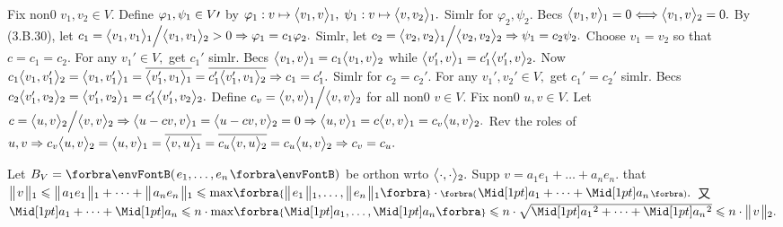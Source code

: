 Fix non0 $v_1,v_2\in V.$ Define $\varphi_1,\psi_1\in V\prime$ by $\varphi_1:v\mapsto\big\langle{}v_1,v{}\big\rangle{_1},\;\psi_1:v\mapsto\big\langle{}v,v_2{}\big\rangle{_1}.$ Simlr for $\varphi_2,\psi_2.$\parSol{}
Becs $\big\langle{}v_1,v{}\big\rangle{_1}=0\Longleftrightarrow\big\langle{}v_1,v{}\big\rangle{_2}=0.$ By (3.B.30), let $c_1=\big\langle{}v_1,v_1{}\big\rangle{_1}\Big/\big\langle{}v_1,v_1{}\big\rangle{_2}>0\Rightarrow\varphi_1=c_1\varphi_2.$\parSol{}
Simlr, let $c_2=\big\langle{}v_2,v_2{}\big\rangle{_1}\Big/\big\langle{}v_2,v_2{}\big\rangle{_2}\Rightarrow\psi_1=c_2\psi_2.$ Choose $v_1=v_2$ so that $c=c_1=c_2.$\vspace{3pt}\parSol{}
For any $v_1'\in V,$ get $c_1'$ simlr. Becs $\big\langle{}v_1,v{}\big\rangle{_1}=c_1\big\langle{}v_1,v{}\big\rangle{_2}$ while $\big\langle{}v_1',v{}\big\rangle{_1}=c_1'\big\langle{}v_1',v{}\big\rangle{_2}.$\vspace{1pt}\parSol{}
Now $c_1\big\langle{}v_1,v_1'{}\big\rangle{_2}=\big\langle{}v_1,v_1'{}\big\rangle{_1}=\overline{\big\langle{}v_1',v_1{}\big\rangle{_1}}=\overline{c_1'\big\langle{}v_1',v_1{}\big\rangle{_2}}\Rightarrow c_1=c_1'.$ Simlr for $c_2=c_2'.$\vspace{3pt}\parSol{}
\Or For any $v_1',v_2'\in V,$ get $c_1'=c_2'$ simlr. Becs $c_2\big\langle{}v_1',v_2{}\big\rangle{_2}=\big\langle{}v_1',v_2{}\big\rangle{_1}=c_1'\big\langle{}v_1',v_2{}\big\rangle{_2}.$\PfEnd\vspace{6pt}\parSol{}
\Or Define $c_v=\big\langle{}v,v{}\big\rangle{_1}\Big/\big\langle{}v,v{}\big\rangle{_2}$ for all non0 $v\in V.$ Fix non0 $u,v\in V.$\parSol{}
Let $c=\big\langle{}u,v{}\big\rangle{_2}\Big/\big\langle{}v,v{}\big\rangle{_2}\Rightarrow\big\langle{}u-cv,v{}\big\rangle{_1}=\big\langle{}u-cv,v{}\big\rangle{_2}=0\Rightarrow\big\langle{}u,v{}\big\rangle{_1}=c\big\langle{}v,v{}\big\rangle{_1}=c_v\big\langle{}u,v{}\big\rangle{_2}.$\vspace{1pt}\parSol{}
Rev the roles of $u,v\Rightarrow c_v\big\langle{}u,v{}\big\rangle{_2}={\big\langle{}u,v{}\big\rangle{_1}}=\overline{\big\langle{}v,u{}\big\rangle{_1}}=\overline{c_u\big\langle{}v,u{}\big\rangle{_2}}=c_u\big\langle{}u,v{}\big\rangle{_2}\Rightarrow c_v=c_u.$\PfEnd
\SepLine\pagebreak

Let $B_V=\Par{e_1,\dots,e_n}$ be orthon wrto $\big\langle{}\cdot,\cdot{}\big\rangle{_2}.$ Supp $v=a_1e_1+\dots+a_ne_n.$\vspace{1pt}\parSol{}
\NOTICE that $\Dvert{v}{_1}\leqslant\Dvert{a_1e_1}{_1}+\dots+\Dvert{a_ne_n}{_1}\leqslant\max\!\Bra{\Dvert{e_1}{_1},\dots,\Dvert{e_n}{_1}}\cdot\BigPar{\aMid{a_1}+\dots+\aMid{a_n}}.$\vspace{3pt}\parSol{}
又 $\aMid{a_1}+\dots+\aMid{a_n}\leqslant n\cdot\max\!\Bra{\aMid{a_1},\dots,\aMid{a_n}}\leqslant n\cdot\sqrt{\aMidsq{a_1}+\dots+\aMidsq{a_n}}\leqslant n\cdot\Dvert{v}{_2}.$\PfEnd
\SepLine

